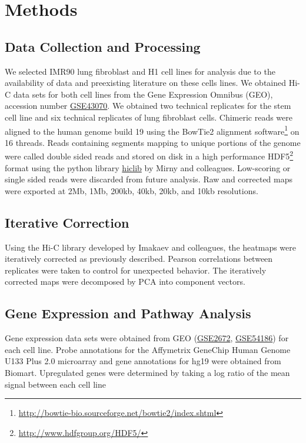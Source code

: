 \chapter{Methods}

\section*{Data Collection and Processing}

We selected IMR90 lung fibroblast and H1  cell lines for analysis due to the availability of data and
preexisting literature on these cells lines.  We obtained Hi-C data sets for both cell lines from the Gene Expression Omnibus
(GEO)\cite{edgar2002}, accession number \href{http://www.ncbi.nlm.nih.gov/geo/query/acc.cgi?acc=GSE43070}{GSE43070}.  We obtained
two technical replicates for the stem cell line and six technical replicates of lung fibroblast cells.  Chimeric reads were
aligned to the human genome build 19 using the BowTie2 alignment
software\footnote{\url{http://bowtie-bio.sourceforge.net/bowtie2/index.shtml}} on 16 threads\cite{langmead2012}.  Reads containing
segments mapping to unique portions of the genome were called \gls{double sided} reads and stored on disk in a high performance
HDF5\footnote{\url{http://www.hdfgroup.org/HDF5/}} format using the python library \href{https://bitbucket.org/mirnylab/hiclib}{hiclib}
by Mirny and colleagues\cite{imakaev2012}.  Low-scoring or single sided reads were discarded from future analysis.  Raw and
corrected maps were exported at 2Mb, 1Mb, 200kb, 40kb, 20kb, and 10kb resolutions.

\section*{Iterative Correction}

Using the Hi-C library developed by Imakaev and colleagues, the heatmaps were iteratively corrected as previously
described\cite{imakaev2012}.  Pearson correlations between replicates were taken to control for unexpected behavior.
The iteratively corrected maps were decomposed by \gls{PCA} into component vectors.

\section*{Gene Expression and Pathway Analysis}

Gene expression data sets were obtained from \gls{GEO} (\href{http://www.ncbi.nlm.nih.gov/geo/query/acc.cgi?acc=GSE2672}{GSE2672},
\href{http://www.ncbi.nlm.nih.gov/geo/query/acc.cgi?acc=GSE54186}{GSE54186}) for each cell line\cite{kim2005}\cite{kim2014}.  Probe
annotations for the Affymetrix GeneChip Human Genome U133 Plus 2.0 microarray and gene annotations for hg19 were obtained from
Biomart\cite{kasprzyk2011}.  Upregulated genes were determined by taking a log ratio of the mean signal between each cell line

